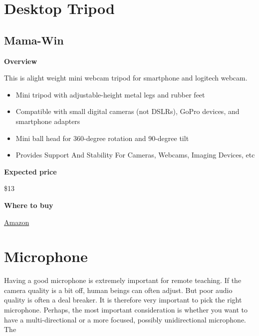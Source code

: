 \section{Desktop Tripod}

\subsection{Mama-Win}

\begin{gram}

\textbf{Overview}

This is alight weight mini webcam tripod for smartphone and logitech webcam.
%
\begin{itemize}
\item
Mini tripod with adjustable-height metal legs and rubber feet

\item
Compatible with small digital cameras (not DSLRs), GoPro devices, and smartphone adapters 

\item
Mini ball head for 360-degree rotation and 90-degree tilt

\item
Provides Support And Stability For Cameras, Webcams, Imaging Devices, etc

\end{itemize}



\textbf{Expected price}

\$13

\textbf{Where to buy}

\href{https://www.amazon.com/Lightweight-Webcam-Tripod-Logitech-Camera/dp/B076SHC6RN/ref=sr_1_1_sspa?crid=2T6CQ3HNRR1XR&keywords=logitech+c920&qid=1582900721&s=electronics&sprefix=logitech+c,electronics,172&sr=1-1-spons&psc=1&spLa=ZW5jcnlwdGVkUXVhbGlmaWVyPUE1VjVUUFpKTU83QUkmZW5jcnlwdGVkSWQ9QTA1NTk1OTVLT1IyTzdRRFVEWkImZW5jcnlwdGVkQWRJZD1BMDEyNzk2NzEyTDVSOEdSQ1QxTEgmd2lkZ2V0TmFtZT1zcF9hdGYmYWN0aW9uPWNsaWNrUmVkaXJlY3QmZG9Ob3RMb2dDbGljaz10cnVl}{Amazon}

\end{gram}

 
\section{Microphone}

Having a good microphone is extremely important for remote teaching. 
%
If the camera quality is a bit off, human beings can often adjust.
%
But poor audio quality is often a deal breaker.
%
It is therefore very important to pick the right microphone.
%
Perhaps, the most important consideration is whether you want to have a
multi-directional  or a more focused, possibly unidirectional microphone.
%
The  

